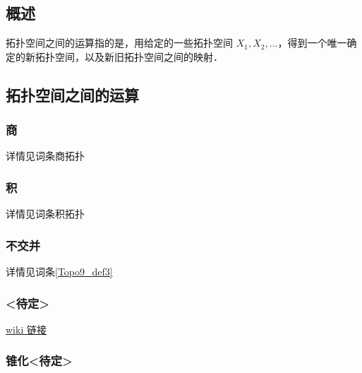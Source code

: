 
\begin{issues}
\issueDraft
\issueTODO
\issueMissDepend
\issueAbstract
\issueNeedCite
\end{issues}

\subsection{概述}

拓扑空间之间的运算指的是，用给定的一些拓扑空间 $X_1, X_2, \dots$，得到一个唯一确定的新拓扑空间，以及新旧拓扑空间之间的映射．


\subsection{拓扑空间之间的运算}

\subsubsection{商}

详情见词条商拓扑


\subsubsection{积}

详情见词条积拓扑


\subsubsection{不交并}

详情见词条\autoref{Topo9_def3}~


\subsubsection{<待定>}

\href{https://en.m.wikipedia.org/wiki/Join_(topology)}{wiki 链接}


\subsubsection{锥化<待定>}

